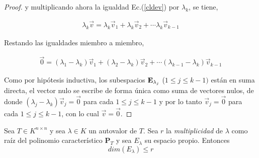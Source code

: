 \begin{corollary}
\begin{proof}
\noindent
y multiplicando ahora la igualdad  Ec.(\ref{cldev}) por $\lambda_k$, se tiene,



 \begin{eqnarray*}
\lambda_k\vec{v}= \lambda_k \vec v_1+\lambda_k \vec v_2+   \cdots \lambda_{k}\vec v_{k-1}
\end{eqnarray*}
 
 
\bigskip
 
Restando las igualdades miembro a miembro, 

\begin{eqnarray*}
\vec{0}= ( \lambda_1 - \lambda_k )\vec v_1+  ( \lambda_2 - \lambda_k ) \vec v_2+   \cdots ( \lambda_{k-1} - \lambda_k )\vec v_{k-1}
\end{eqnarray*}
   

   

Como por hipótesis inductiva, los subespacios $\bold E_{\lambda_j}$ ($1 \leq j \leq  k-1)$ están en suma directa,  el vector nulo se escribe de forma única como suma de vectores nulos, de donde  
   $( \lambda_j - \lambda_k )\vec v_j= \vec{0} $  para cada $1 \leq j \leq  k-1$ y por lo tanto $\vec v_j= \vec{0} $  para cada $1 \leq j \leq  k-1$, con lo cual $\vec{v}=\vec{0}$.
\end{proof}
\end{corollary}


\bigskip






\bigskip

\begin{theorem}



Sea $T  \in K^{n \times n}$ y sea $\lambda  \in K$ un autovalor de $T$. Sea $r$ la \textit{multiplicidad}  de $\lambda$ como raíz del polinomio característico  $\mathbf{P}_T $  y sea $E_{\lambda}$ su espacio propio. Entonces 
$$ dim(E_{\lambda}) \leq r  $$
\end{theorem}


\bigskip

